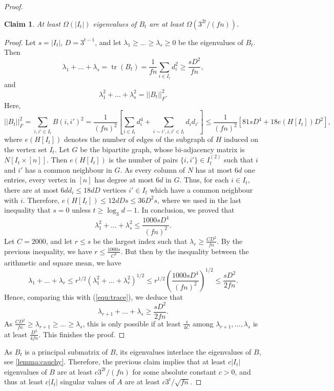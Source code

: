 \documentclass[11pt]{amsart}
\theoremstyle{plain}
\newtheorem{claim}[theorem]{Claim}
\theoremstyle{definition}
\DeclareMathOperator{\tr}{tr}
\begin{document}
\begin{proof}
\begin{claim}
At least $\Omega(|I_t|)$ eigenvalues of $B_t$ are at least $\Omega(3^{2t}/(fn))$. 
\end{claim}

\begin{proof}
Let $s=|I_t|$, $D=3^{t-1}$, and let $\lambda_1\geq \dots\geq \lambda_s\geq 0$ be the eigenvalues of $B_t$. Then 
\begin{equation}\label{equ:trace}
    \lambda_1+\dots+\lambda_s=\tr(B_t)=\frac{1}{fn}\sum_{i\in I_t}d_i^2\geq \frac{sD^2}{fn},
\end{equation}
and
$$\lambda_1^2+\dots+\lambda_s^2=||B_t||_F^2.$$
Here,
$$||B_t||_F^2=\sum_{i,i'\in I_t}B(i,i')^2=\frac{1}{(fn)^2}\left[\sum_{i\in I_t}d_i^4+\sum_{i\sim i',i,i'\in I_t}d_id_{i'} \right]\leq \frac{1}{(fn)^2}\left[81sD^{4}+18e(H[I_t])D^{2}\right],$$
where $e(H[I_t])$ denotes the number of edges of the subgraph of $H$ induced on the vertex set $I_t$. Let $G$ be the bipartite graph, whose bi-adjacency matrix is $N[I_t\times [n]]$. Then $e(H[I_t])$ is the number of pairs $\{i,i'\}\in I_t^{(2)}$ such that $i$ and $i'$ has a common neighbour in $G$. As every column of $N$ has at most $6d$ one entries, every vertex in $[n]$ has degree at most $6d$ in $G$. Thus, for each $i\in I_t$, there are at most $6dd_i\leq 18dD$ vertices $i'\in I_t$ which have a common neighbour with $i$. Therefore, $e(H[I_t])\leq 12dDs\leq 36D^2s$, where we used in the last inequality that $s=0$ unless $t\geq \log_3 d-1$. In conclusion, we proved that 
$$\lambda_1^2+\dots+\lambda_s^2\leq \frac{1000sD^4}{(fn)^2}.$$
Let $C=2000$, and let $r\leq s$ be the largest index such that $\lambda_r\geq \frac{CD^2}{fn}$. By the previous inequality, we have $r\leq \frac{1000s}{C^2}$. But then by the inequality between the arithmetic and square mean, we have $$\lambda_1+\dots+\lambda_r\leq r^{1/2}(\lambda_1^2+\dots+\lambda_r^2)^{1/2}\leq r^{1/2}\left(\frac{1000sD^4}{(fn)^2}\right)^{1/2}\leq \frac{sD^2}{2fn}.$$
Hence, comparing this with (\ref{equ:trace}), we deduce that
$$\lambda_{r+1}+\dots+\lambda_{s}\geq \frac{sD^2}{2fn}.$$
As $\frac{CD^2}{fn}\geq \lambda_{r+1}\geq\dots\geq \lambda_s$, this is only possible if at least $\frac{s}{4C}$ among $\lambda_{r+1},\dots,\lambda_s$ is at least $\frac{D^2}{4fn}$. This finishes the proof.
\end{proof}
As $B_t$ is a principal submatrix of $B$, its eigenvalues interlace the eigenvalues of $B$, see \cref{lemma:cauchy}. Therefore, the previous claim implies that at least $c|I_t|$ eigenvalues of $B$ are at least $c3^{2t}/(fn)$ for some absolute constant $c>0$, and thus at least $c|I_t|$ singular values of $A$ are at least $c3^t/\sqrt{fn}$. 


\end{proof}
\end{document}
